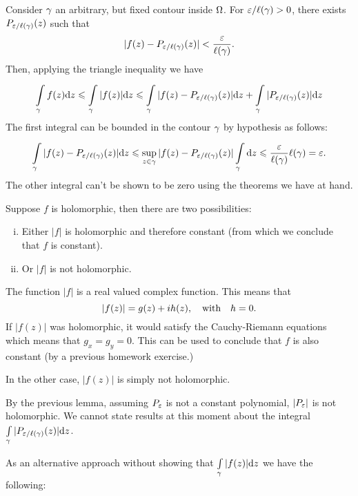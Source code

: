 \documentclass[12pt]{memoir}
\begin{document}
\begin{ptcb}
Consider $\gamma$ an arbitrary, but fixed contour inside $\Omega$. For $\varepsilon/\ell(\gamma)>0$, there exists $P_{\varepsilon/\ell(\gamma)}(z)$ such that
$$|f(z)-P_{\varepsilon/\ell(\gamma)}(z)|<\frac{\varepsilon}{\ell(\gamma)}.$$
Then, applying the triangle inequality we have 
\begin{align*}
    \int\limits_{\gamma}^{}f(z)\dd z\leqslant\int\limits_{\gamma}^{}|f(z)|\dd z\leqslant \int\limits_{\gamma}^{}|f(z)-P_{\varepsilon/\ell(\gamma)}(z)|\dd z+\int\limits_{\gamma}^{}|P_{\varepsilon/\ell(\gamma)}(z)|\dd z 
\end{align*}
The first integral can be bounded in the contour $\gamma$ by hypothesis as follows: 
$$\int\limits_{\gamma}^{}|f(z)-P_{\varepsilon/\ell(\gamma)}(z)|\dd z\leqslant\sup_{z\in\gamma}|f(z)-P_{\varepsilon/\ell(\gamma)}(z)|\int\limits_{\gamma}\dd z\leqslant \frac{\varepsilon}{\ell(\gamma)}\ell(\gamma)=\varepsilon.$$
The other integral can't be shown to be zero using the theorems we have at hand.
\end{ptcb}

\begin{Lem}
    Suppose $f$ is holomorphic, then there are two possibilities: 
    \begin{enumerate}[i)]
        \itemsep=-0.4em
        \item Either $|f|$ is holomorphic and therefore constant (from which we conclude that $f$ is constant). 
        \item Or $|f|$ is not holomorphic.
    \end{enumerate}
\end{Lem}

\begin{ptcbp}
The function $|f|$ is a real valued complex function. This means that 
$$|f(z)|=g(z)+ih(z),\quad\text{with}\quad h=0.$$
If $|f(z)|$ was holomorphic, it would satisfy the Cauchy-Riemann equations which means that $g_x=g_y=0$. This can be used to conclude that $f$ is also constant (by a previous homework exercise.)\par 
In the other case, $|f(z)|$ is simply not holomorphic.
\end{ptcbp}

By the previous lemma, assuming $P_\varepsilon$ is not a constant polynomial, $|P_\varepsilon|$ is not holomorphic. We cannot state results at this moment about the integral $\int\limits_{\gamma}^{}|P_{\varepsilon/\ell(\gamma)}(z)|\dd z$.\par 
As an alternative approach without showing that $\int\limits_{\gamma}^{}|f(z)|\dd z$ we have the following:
\end{document}
